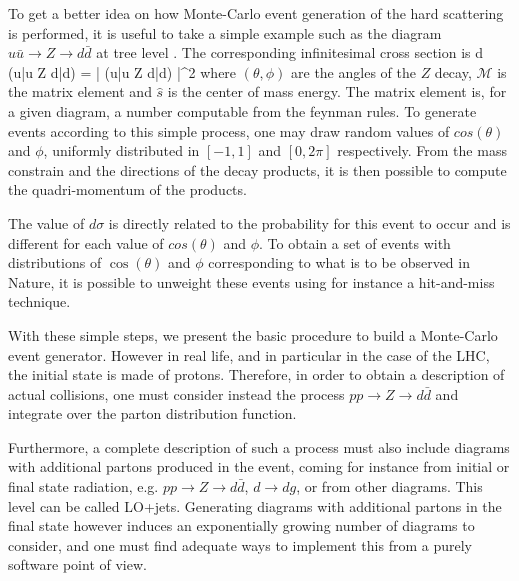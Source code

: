             To get a better idea on how Monte-Carlo event generation of the hard scattering
            is performed, it is useful to take a simple example such as the diagram
            $u\bar{u} \rightarrow Z \rightarrow d\bar{d}$ at tree level \cite{MCGenLesHouches}. The corresponding
            infinitesimal cross section is
            {
                d \sigma(u\bar{u} \rightarrow Z \rightarrow d\bar{d})
                =
                \left|
                    (u\bar{u} \rightarrow Z \rightarrow d\bar{d})
                \right|^2
            }
            where $(\theta,\phi)$ are the angles of the $Z$ decay, $\mathcal{M}$
            is the matrix element and $\hat{s}$ is the center of mass energy. The matrix
            element is, for a given diagram, a number computable from the feynman rules.
            To generate events according to this simple process, one may draw random
            values of $cos(\theta)$ and $\phi$, uniformly distributed in $[-1, 1]$ and
            $[0,2\pi]$ respectively. From the mass constrain and the directions of the
            decay products, it is then possible to compute the quadri-momentum of the products.

            The value of $d\sigma$ is directly related to the probability for this event
            to occur and is different for each value of $cos(\theta)$ and $\phi$. To obtain
            a set of events with distributions of $\cos(\theta)$ and $\phi$ corresponding to
            what is to be observed in Nature, it is possible to unweight these events using
            for instance a hit-and-miss technique.

            With these simple steps, we present the basic procedure to build a Monte-Carlo
            event generator. However in real life, and in particular in the case of the
            LHC, the initial state is made of protons. Therefore, in order to obtain a
            description of actual collisions, one must consider instead the process
            $pp \rightarrow Z \rightarrow d\bar{d}$ and integrate over the parton distribution
            function.

            Furthermore, a complete description of such a process must also include
            diagrams with additional partons produced in the event, coming for instance
            from initial or final state radiation, e.g. $pp \rightarrow Z \rightarrow
            d\bar{d}$, $d\rightarrow dg$, or from other diagrams. This level can be called
            LO+jets. Generating diagrams with additional partons in the final state however
            induces an exponentially growing number of diagrams to consider, and one must
            find adequate ways to implement this from a purely software point of view.

